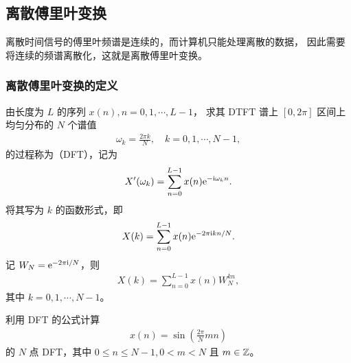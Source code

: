 \subsection{离散傅里叶变换}

离散时间信号的傅里叶频谱是连续的，而计算机只能处理离散的数据，
因此需要将连续的频谱离散化，这就是离散傅里叶变换。

\subsubsection{离散傅里叶变换的定义}

\begin{definition}
    由长度为 $L$ 的序列 $x(n), n = 0, 1, \cdots, L - 1$，
    求其 DTFT 谱上 $[0, 2\pi]$ 区间上均匀分布的 $N$ 个谱值
    \begin{align*}
        \omega_k = \frac{2\pi k}{N}, \quad k = 0, 1, \cdots, N - 1,
    \end{align*}
    的过程称为（DFT），记为
    \begin{align*}
        X'(\omega_k) = \sum_{n = 0}^{L - 1}x(n)\mathrm{e}^{-\mathrm{i}\omega_k n}.
    \end{align*}
    将其写为 $k$ 的函数形式，即
    \begin{align*}
        X(k) = \sum_{n = 0}^{L - 1}x(n)\mathrm{e}^{-2\pi\mathrm{i} k n/N}.
    \end{align*}
    记 $W_N = \mathrm{e}^{-2\pi\mathrm{i}/N}$，则
    \begin{align*}
        X(k) = \sum_{n = 0}^{L - 1}x(n)W_N^{kn},
    \end{align*}
    其中 $k = 0, 1, \cdots, N - 1$。
\end{definition}

\begin{exercise}
    利用 DFT 的公式计算
    \begin{align*}
        x(n) = \sin(\frac{2\pi}{N}mn)
    \end{align*}
    的 $N$ 点 DFT，其中 $0 \le n \le N - 1, 0 < m < N$ 且 $m \in \mathbb{Z}$。
\end{exercise}

